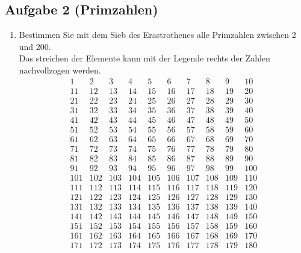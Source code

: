 \documentclass[11pt,a4paper,ngerman]{article}
\begin{document}


\subsection*{Aufgabe 2 (Primzahlen)}

\begin{enumerate}[\bfseries a)]

\item Bestimmen Sie mit dem Sieb des Erastrothenes alle Primzahlen zwischen 2 und 200. \\
Das streichen der Elemente kann mit der Legende rechts der Zahlen nachvollzogen werden.\\
$$
\begin{array}{cccccccccc}
1 & 2 & 3 & 4 & 5 & 6 & 7 & 8 & 9 & 10 \\
11 & 12 & 13 & 14 & 15 & 16 & 17 & 18 & 19 & 20 \\
21 & 22 & 23 & 24 & 25 & 26 & 27 & 28 & 29 & 30 \\
31 & 32 & 33 & 34 & 35 & 36 & 37 & 38 & 39 & 40 \\
41 & 42 & 43 & 44 & 45 & 46 & 47 & 48 & 49 & 50 \\
51 & 52 & 53 & 54 & 55 & 56 & 57 & 58 & 59 & 60 \\
61 & 62 & 63 & 64 & 65 & 66 & 67 & 68 & 69 & 70 \\
71 & 72 & 73 & 74 & 75 & 76 & 77 & 78 & 79 & 80 \\
81 & 82 & 83 & 84 & 85 & 86 & 87 & 88 & 89 & 90 \\
91 & 92 & 93 & 94 & 95 & 96 & 97 & 98 & 99 & 100 \\
101 & 102 & 103 & 104 & 105 & 106 & 107 & 108 & 109 & 110 \\
111 & 112 & 113 & 114 & 115 & 116 & 117 & 118 & 119 & 120 \\
121 & 122 & 123 & 124 & 125 & 126 & 127 & 128 & 129 & 130 \\
131 & 132 & 133 & 134 & 135 & 136 & 137 & 138 & 139 & 140 \\
141 & 142 & 143 & 144 & 145 & 146 & 147 & 148 & 149 & 150 \\
151 & 152 & 153 & 154 & 155 & 156 & 157 & 158 & 159 & 160 \\
161 & 162 & 163 & 164 & 165 & 166 & 167 & 168 & 169 & 170 \\
171 & 172 & 173 & 174 & 175 & 176 & 177 & 178 & 179 & 180 \\

\end{array}$$
\end{enumerate}
\end{document}
